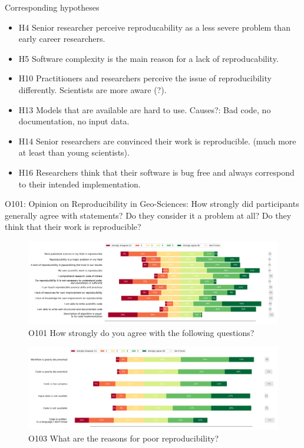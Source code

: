 \documentclass{article}
\begin{document}
Corresponding hypotheses
\begin{itemize}
	\item H4 Senior researcher perceive reproducability as a less severe problem than early career researchers.
 	\item H5 Software complexity is the main reason for a lack of reproducability.
	\item H10 Practitioners and researchers perceive the issue of reproducibility differently. Scientists are more aware (?).
	\item H13 Models that are available are hard to use. Causes?: Bad code, no documentation, no input data.
	\item H14 Senior researchers are convinced their work is reproducible. (much more at least than young scientists).
	\item H16 Researchers think that their software is bug free and always correspond to their intended implementation.
\end{itemize}

O101: Opinion on Reproducibility in Geo-Sciences: How strongly did participants generally agree with statements?
Do they consider it a problem at all? Do they think that their work is reproducible?

\begin{figure}[!p]
    \centering
    \includegraphics[width=\textwidth]{../figs/O101.png}
	\caption{O101 How strongly do you agree with the following questions?}
    \label{fig:O101}
\end{figure}

\begin{figure}[!p]
    \centering
    \includegraphics[width=\textwidth]{../figs/O103.png}
	\caption{O103 What are the reasons for poor reproducibility?}
    \label{fig:O103}
\end{figure}
\end{document}
